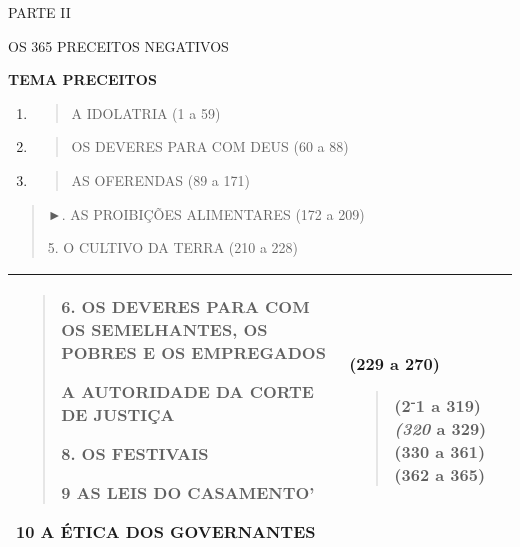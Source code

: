 PARTE II

OS 365 PRECEITOS NEGATIVOS

\textbf{TEMA PRECEITOS}

\begin{enumerate}
\def\labelenumi{\arabic{enumi}.}
\item
  \begin{quote}
  A IDOLATRIA (1 a 59)
  \end{quote}
\item
  \begin{quote}
  OS DEVERES PARA COM DEUS (60 a 88)
  \end{quote}
\item
  \begin{quote}
  AS OFERENDAS (89 a 171)
  \end{quote}
\end{enumerate}

\begin{quote}
►. AS PROIBIÇÕES ALIMENTARES (172 a 209)

5. O CULTIVO DA TERRA (210 a 228)
\end{quote}

\begin{longtable}[]{@{}ll@{}}
\toprule
\endhead
\begin{minipage}[t]{0.47\columnwidth}\raggedright
\begin{quote}
6. OS DEVERES PARA COM OS SEMELHANTES, OS POBRES E OS EMPREGADOS

A AUTORIDADE DA CORTE DE JUSTIÇA

8. OS FESTIVAIS

9 AS LEIS DO CASAMENTO'
\end{quote}

10 A ÉTICA DOS GOVERNANTES\strut
\end{minipage} & \begin{minipage}[t]{0.47\columnwidth}\raggedright
(229 a 270)

\begin{quote}
(2\textsuperscript{-}1 a 319) \emph{(320} a 329) (330 a 361) (362 a 365)
\end{quote}\strut
\end{minipage}\tabularnewline
\bottomrule
\end{longtable}

